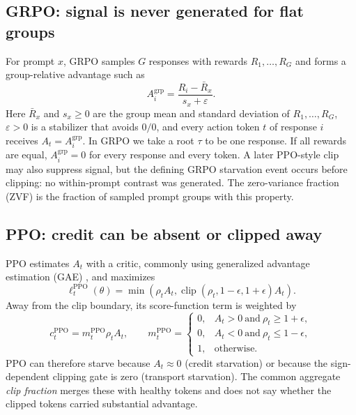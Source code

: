 \documentclass{article}
\begin{document}
\subsection{GRPO: signal is never generated for flat groups}

For prompt $x$, GRPO samples $G$ responses with rewards $R_1,\ldots,R_G$ and
forms a group-relative advantage such as
\begin{equation}
  A_i^{\mathrm{grp}}=
  \frac{R_i-\bar R_x}{s_x+\varepsilon}.
  \label{eq:grpo-adv}
\end{equation}
Here $\bar R_x$ and $s_x\ge0$ are the group mean and standard deviation of
$R_1,\ldots,R_G$, $\varepsilon>0$ is a stabilizer that avoids $0/0$, and every
action token $t$ of response $i$ receives $A_t=A_i^{\mathrm{grp}}$.  In GRPO we
take a root $\tau$ to be one response.  If all rewards are equal,
$A_i^{\mathrm{grp}}=0$ for every response and every token.  A later PPO-style clip may also suppress signal, but the defining
GRPO starvation event occurs before clipping: no within-prompt contrast was
generated.  The zero-variance fraction (ZVF) is the fraction of sampled prompt
groups with this property.

\subsection{PPO: credit can be absent or clipped away}

PPO estimates $A_t$ with a critic, commonly using generalized advantage
estimation (GAE) \citep{schulman2016gae}, and maximizes
\begin{equation}
  \ell_t^{\mathrm{PPO}}(\theta)=
  \min\!\left(\rho_t A_t,
    \operatorname{clip}(\rho_t,1-\epsilon,1+\epsilon)A_t\right).
  \label{eq:ppo}
\end{equation}
Away from the clip boundary, its score-function term is weighted by
\begin{equation}
  c_t^{\mathrm{PPO}}=m_t^{\mathrm{PPO}}\rho_t A_t,
  \qquad
  m_t^{\mathrm{PPO}}=
  \begin{cases}
    0, & A_t>0\ \text{and}\ \rho_t\geq1+\epsilon,\\
    0, & A_t<0\ \text{and}\ \rho_t\leq1-\epsilon,\\
    1, & \text{otherwise.}
  \end{cases}
  \label{eq:ppo-gate}
\end{equation}
PPO can therefore starve because $A_t\approx0$ (credit starvation) or because
the sign-dependent clipping gate is zero (transport starvation).  The common
aggregate \emph{clip fraction} merges these with healthy tokens and does not
say whether the clipped tokens carried substantial advantage.
\end{document}
